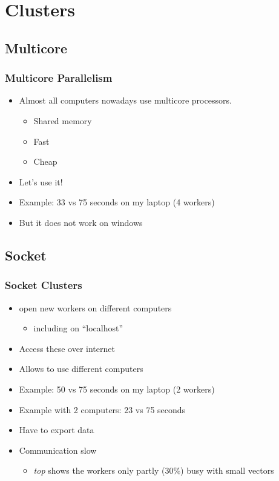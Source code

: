 \documentclass[pdftex]{beamer}
\begin{document}
\section{Clusters}
\subsection{Multicore}

\begin{frame}
  \frametitle{Multicore Parallelism}
  \begin{itemize}
  \item Almost all computers nowadays use multicore processors.
    \begin{itemize}
    \item Shared memory
    \item Fast
    \item Cheap
    \end{itemize}
  \item Let's use it!
  \item Example: 33 vs 75 seconds on my laptop (4 workers)
    \pause
  \item But it does not work on windows \frownie{}
  \end{itemize}
\end{frame}


\subsection{Socket}

\begin{frame}
  \frametitle{Socket Clusters}
  \begin{itemize}
  \item open new workers on different computers
    \begin{itemize}
    \item including on ``localhost''
    \end{itemize}
  \item Access these over internet
  \item Allows to use different computers
  \item Example: 50 vs 75 seconds on my laptop (2 workers)
  \item Example with 2 computers: 23 vs 75 seconds
    \pause
  \item Have to export data
  \item Communication slow
    \begin{itemize}
    \item \emph{top} shows the workers only partly (30\%) busy with
      small vectors
    \end{itemize}
  \end{itemize}
\end{frame}
\end{document}
